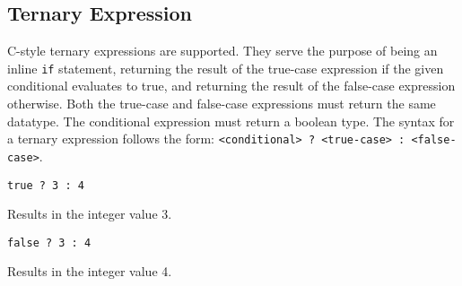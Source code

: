 
\subsection{Ternary Expression}
{
	C-style ternary expressions are supported.
	They serve the purpose of being an inline \texttt{if}
	statement, returning the result of the true-case expression
	if the given conditional evaluates to true, and returning the result
	of the false-case expression otherwise.
	Both the true-case and false-case expressions must return the same
	datatype. The conditional expression must return a boolean type.
	The syntax for a ternary expression follows the
	form: \texttt{<conditional> ? <true-case> : <false-case>}.
	
	\begin{itemize}
	{
		\item[] \texttt{true ? 3 : 4}
		
			Results in the integer value 3.
		
		\item[] \texttt{false ? 3 : 4}
		
			Results in the integer value 4.
	}
	\end{itemize}
}
